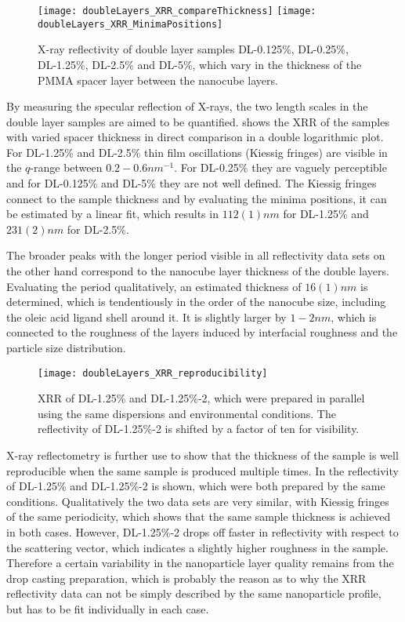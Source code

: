 \documentclass[\main/dresen_thesis.tex]{subfiles}
\begin{document}
  \label{sec:doublelayers:layers:pnr}
  \begin{figure}[tb]
    \centering
    \texttt{[image: doubleLayers\_XRR\_compareThickness]}
    \texttt{[image: doubleLayers\_XRR\_MinimaPositions]}
    \caption{\label{fig:doublelayers:xrr:thicknessComparison}X-ray reflectivity of double layer samples DL-0.125\%, DL-0.25\%, DL-1.25\%, DL-2.5\% and DL-5\%, which vary in the thickness of the PMMA spacer layer between the nanocube layers.}
  \end{figure}
  By measuring the specular reflection of X-rays, the two length scales in the double layer samples are aimed to be quantified.
   shows the XRR of the samples with varied spacer thickness in direct comparison in a double logarithmic plot.
  For DL-1.25\% and DL-2.5\% thin film oscillations (Kiessig fringes) are visible in the $q$-range between $0.2 - 0.6 \unit{nm^{-1}}$.
  For DL-0.25\% they are vaguely perceptible and for DL-0.125\% and DL-5\% they are not well defined.
  The Kiessig fringes connect to the sample thickness and by evaluating the minima positions, it can be estimated by a linear fit, which results in $112(1) \unit{nm}$ for DL-1.25\% and $231(2) \unit{nm}$ for DL-2.5\%.

  The broader peaks with the longer period visible in all reflectivity data sets on the other hand correspond to the nanocube layer thickness of the double layers.
  Evaluating the period qualitatively, an estimated thickness of $16(1) \unit{nm}$ is determined, which is tendentiously in the order of the nanocube size, including the oleic acid ligand shell around it.
  It is slightly larger by $1 - 2 \unit{nm}$, which is connected to the roughness of the layers induced by interfacial roughness and the particle size distribution.

  \begin{figure}[tb]
    \centering
    \texttt{[image: doubleLayers\_XRR\_reproducibility]}
    \caption{\label{fig:doublelayers:xrr:reproducibility}XRR of DL-1.25\% and DL-1.25\%-2, which were prepared in parallel using the same dispersions and environmental conditions. The reflectivity of DL-1.25\%-2 is shifted by a factor of ten for visibility.}
  \end{figure}

  X-ray reflectometry is further use to show that the thickness of the sample is well reproducible when the same sample is produced multiple times.
  In  the reflectivity of DL-1.25\% and DL-1.25\%-2 is shown, which were both prepared by the same conditions.
  Qualitatively the two data sets are very similar, with Kiessig fringes of the same periodicity, which shows that the same sample thickness is achieved in both cases.
  However, DL-1.25\%-2 drops off faster in reflectivity with respect to the scattering vector, which indicates a slightly higher roughness in the sample.
  Therefore a certain variability in the nanoparticle layer quality remains from the drop casting preparation, which is probably the reason as to why the XRR reflectivity data can not be simply described by the same nanoparticle profile, but has to be fit individually in each case.
\end{document}

